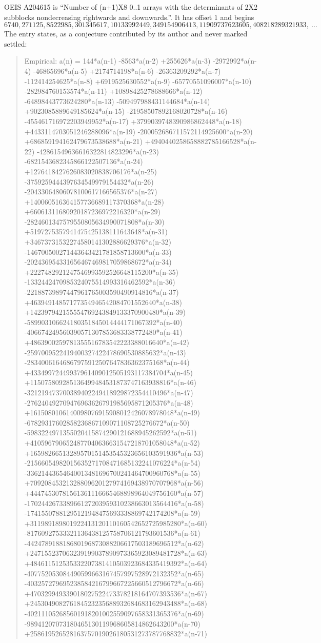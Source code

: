 \documentclass[11pt,a4paper]{article}
\theoremstyle{plain}
\theoremstyle{definition}
\begin{document}
OEIS A204615 is ``Number of (n+1)X8 0..1 arrays with the determinants of 2X2 subblocks nondecreasing rightwards and downwards.''. It has offset $1$ and begins
\[
6740, 271125, 8522985, 301345617, 10133992449, 349154906413, 11909737623605, 408218289321933,\ \dots
\]
The entry states, as a conjecture contributed by its author and never marked settled:
\begin{quote}
Empirical: a(n) = 144*a(n-1) -8563*a(n-2) +255626*a(n-3) -2972992*a(n-4) -46865696*a(n-5) +2174714198*a(n-6) -26363209292*a(n-7) -112414254625*a(n-8) +6919525630552*a(n-9) -65770551096007*a(n-10) -282984760153574*a(n-11) +10898425278688666*a(n-12) -64898443773624280*a(n-13) -509497988431144684*a(n-14) +9023085889649185624*a(n-15) -21958507892168020728*a(n-16) -455461716972203949952*a(n-17) +3799039748390986862448*a(n-18) +4433114703051246288096*a(n-19) -200052686711572114925600*a(n-20) +686859194162479673538688*a(n-21) +4940440258658882785166528*a(n-22) -42861549636616322814823296*a(n-23) -6821543682345866122507136*a(n-24) +1276418427626083020838706176*a(n-25) -3759259444397634549979154432*a(n-26) -20433064806078100617166565376*a(n-27) +140060516364157736689117370368*a(n-28) +66061311680920187236972216320*a(n-29) -2824601347579550805634990071808*a(n-30) +5197275357941475425138111643648*a(n-31) +34673731532274580141302886629376*a(n-32) -146700500271443643421781858713600*a(n-33) -202436954331656467469817059868672*a(n-34) +2227482921247546993592526648115200*a(n-35) -1332442470985324075514993316462592*a(n-36) -22188739897447961765003590490914816*a(n-37) +46394914857177354946542084701552640*a(n-38) +142397942155554769243849133370900480*a(n-39) -589903106624180351845014444171067392*a(n-40) -406674249560390571307853683338772480*a(n-41) +4863900259781355516783542223388016640*a(n-42) -2597009522419400327422478690530885632*a(n-43) -28340061646867975912507647836362375168*a(n-44) +43349972449937961409012505193117384704*a(n-45) +115075809285136499484531873747163938816*a(n-46) -321219473700389402249418929872354410496*a(n-47) -276240492709476963626791985695871205376*a(n-48) +1615080106140098076915908012426078978048*a(n-49) -67829317602858236867109071108725276672*a(n-50) -5983224971355020415874290121688945262592*a(n-51) +4105967906524877040636631547218701058048*a(n-52) +16598266513289570151453545323656103591936*a(n-53) -21566054982015635271708471685132241076224*a(n-54) -33621443654640013481696700241464700960768*a(n-55) +70920845321328809620127974169438970707968*a(n-56) +44474530781561361116665468898964049756160*a(n-57) -170244267338966127203959310238663013564416*a(n-58) -17415507881295121948475693338869742174208*a(n-59) +311989189801922413120110160542652725985280*a(n-60) -81760927533321136438125758706121793601536*a(n-61) -442478918818680196873088206617503189696512*a(n-62) +247155237063239199037890973365923089481728*a(n-63) +484611512535332207381410503923684335419392*a(n-64) -407752053084490599663167457997528972132352*a(n-65) -403257279695238584216799667225660512796672*a(n-66) +470329949339018027522473378218164707393536*a(n-67) +245304908276184523235688932684683162943488*a(n-68) -402111052685601918201002559097658331365376*a(n-69) -98941207073180465130119968605814862643200*a(n-70) +258619526528163757019026180531273787768832*a(n-71) 
\end{quote}
\end{document}
